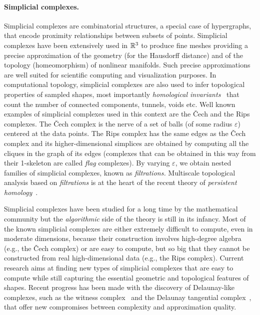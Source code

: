 \paragraph{Simplicial complexes.}  
Simplicial complexes are combinatorial structures, a special case of hypergraphs, that encode proximity relationships between subsets of points.
Simplicial complexes have been extensively used in $\mathbb R ^3$ to produce fine meshes  providing a precise approximation of the geometry  (for the Hausdorff distance) and of the topology  (homeomorphism) of nonlinear manifolds.  Such precise approximations are
 well suited for scientific computing and visualization purposes.  In computational topology, simplicial complexes are also used to infer topological properties of sampled shapes, most importantly {\em homological invariants}~\cite{ah-at-2002} that count the number of connected components, tunnels, voids etc.  Well known examples of simplicial complexes used in this context are the \v{C}ech and the Rips complexes. The \v{C}ech 
complex is the nerve of a set of balls (of some radius $\varepsilon$) centered at the data points. 
The Rips complex  has the same edges as the \v{C}ech complex and its higher-dimensional simplices are obtained by computing all the cliques in the graph of its edges (complexes that can be obtained in this way from their 1-skeleton are called {\em flag} complexes). By varying $\varepsilon$, we obtain nested families of simplicial complexes, known as {\em filtrations.}
Multiscale topological analysis based on {\em filtrations} is at the heart of the recent theory of {\em persistent homology}~\cite{hh-ct-2010,az-tfc-2009}.
 
Simplicial complexes have been studied for a long time by the mathematical community but the {\em algorithmic} side of the theory is still in its infancy. Most of the known simplicial complexes are either extremely difficult to compute, even in moderate dimensions, because their construction involves high-degree algebra (e.g., the  \v{C}ech complex) or are easy to compute, but so big that they cannot be constructed from real high-dimensional data (e.g., the Rips complex). Current research aims at finding new types of simplicial complexes that are easy to compute while still capturing the essential geometric and topological features of shapes. Recent progress has been made with the discovery of Delaunay-like complexes, such as the witness complex~\cite{cds-tewc-2004} and the Delaunay tangential complex~\cite{geometrica-7142i}, that offer new compromises between complexity and approximation quality.

